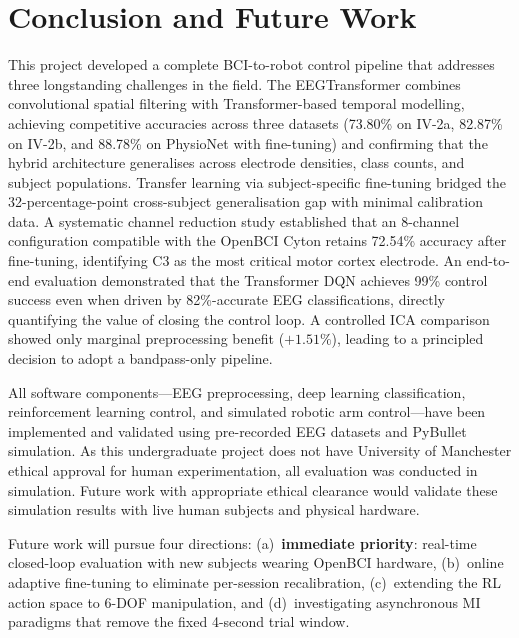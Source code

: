 \documentclass[12pt, a4paper]{article}
\begin{document}
\section{Conclusion and Future Work}

This project developed a complete BCI-to-robot control pipeline that addresses three longstanding challenges in the field. The EEGTransformer combines convolutional spatial filtering with Transformer-based temporal modelling, achieving competitive accuracies across three datasets (73.80\% on IV-2a, 82.87\% on IV-2b, and 88.78\% on PhysioNet with fine-tuning) and confirming that the hybrid architecture generalises across electrode densities, class counts, and subject populations. Transfer learning via subject-specific fine-tuning bridged the 32-percentage-point cross-subject generalisation gap with minimal calibration data. A systematic channel reduction study established that an 8-channel configuration compatible with the OpenBCI Cyton retains 72.54\% accuracy after fine-tuning, identifying C3 as the most critical motor cortex electrode. An end-to-end evaluation demonstrated that the Transformer DQN achieves 99\% control success even when driven by 82\%-accurate EEG classifications, directly quantifying the value of closing the control loop. A controlled ICA comparison showed only marginal preprocessing benefit ($+1.51\%$), leading to a principled decision to adopt a bandpass-only pipeline.

All software components---EEG preprocessing, deep learning classification, reinforcement learning control, and simulated robotic arm control---have been implemented and validated using pre-recorded EEG datasets and PyBullet simulation. As this undergraduate project does not have University of Manchester ethical approval for human experimentation, all evaluation was conducted in simulation. Future work with appropriate ethical clearance would validate these simulation results with live human subjects and physical hardware.

Future work will pursue four directions: (a)~\textbf{immediate priority}: real-time closed-loop evaluation with new subjects wearing OpenBCI hardware, (b)~online adaptive fine-tuning to eliminate per-session recalibration, (c)~extending the RL action space to 6-DOF manipulation, and (d)~investigating asynchronous MI paradigms that remove the fixed 4-second trial window.
\end{document}
